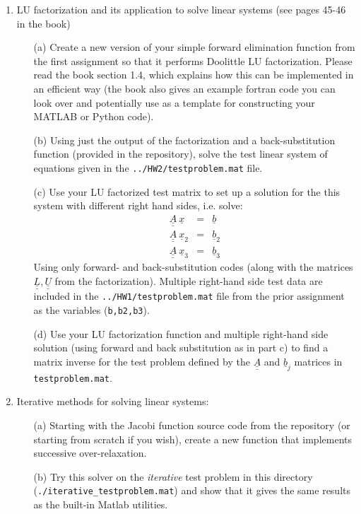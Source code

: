 \documentclass{article}
\begin{document}
\begin{enumerate}
  \item LU factorization and its application to solve linear systems (see pages 45-46 in the book)
  \begin{itemize}
    \item[(a)] Create a new version of your simple forward elimination function from the first assignment so that it performs Doolittle LU factorization.  Please read the book section 1.4, which explains how this can be implemented in an efficient way (the book also gives an example fortran code you can look over and potentially use as a template for constructing your MATLAB or Python code).  
    \item[(b)] Using just the output of the factorization and a back-substitution function (provided in the repository), solve the test linear system of equations given in the \texttt{../HW2/testproblem.mat} file.  
    \item[(c)] Use your LU factorized test matrix to set up a solution for the this system with different right hand sides, i.e. solve:
    \begin{eqnarray}
      \underline{\underline{A}} ~\underline{x} &=& \underline{b} \\
      \underline{\underline{A}} ~\underline{x}_2 &=& \underline{b}_2 \\
      \underline{\underline{A}} ~\underline{x}_3 &=& \underline{b}_3    
    \end{eqnarray}   
    Using only forward- and back-substitution codes (along with the matrices $\underline{\underline{L}}, \underline{\underline{U}}$ from the factorization).  Multiple right-hand side test data are included in the \texttt{../HW1/testproblem.mat} file from the prior assignment as the variables (\texttt{b,b2,b3}).
    \item[(d)] Use your LU factorization function and multiple right-hand side solution (using forward and back substitution as in part c) to find a matrix inverse for the test problem defined by the $\underline{\underline{A}}$ and  $\underline{b}_j$ matrices in \texttt{testproblem.mat}.  
  \end{itemize}
  
  
  \item Iterative methods for solving linear systems:  
  \begin{itemize}
    \item[(a)] Starting with the Jacobi function source code from the repository (or starting from scratch if you wish), create a new function that implements successive over-relaxation.  
    \item[(b)] Try this solver on the \emph{iterative} test problem in this directory (\texttt{./iterative\_testproblem.mat}) and show that it gives the same results as the built-in Matlab utilities. 
  \end{itemize}  
\end{enumerate}
\end{document}
